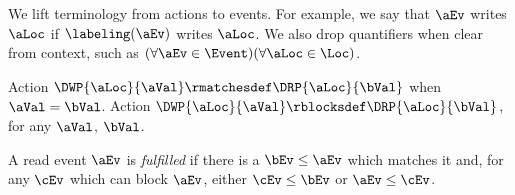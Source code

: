 We lift terminology from actions to events.  For example, we say that $\aEv$
writes $\aLoc$ if $\labeling(\aEv)$ writes $\aLoc$.  We also drop quantifiers
when clear from context, such as
$(\forall\aEv\in\Event)(\forall\aLoc\in\Loc)$.

\begin{definition}
  \label{def:fulfilled}
  Action $\DWP{\aLoc}{\aVal} \rmatchesdef \DRP{\aLoc}{\bVal}$ when $\aVal=\bVal$.
  Action $\DWP{\aLoc}{\aVal} \rblocksdef \DRP{\aLoc}{\bVal}$, for any
  $\aVal$, $\bVal$.
  

  A read event $\aEv$ is \emph{fulfilled} if there is a $\bEv\le\aEv$ which
  matches it and, for any $\cEv$ which can block $\aEv$, either $\cEv\le\bEv$
  or $\aEv\le\cEv$.

\end{definition}

